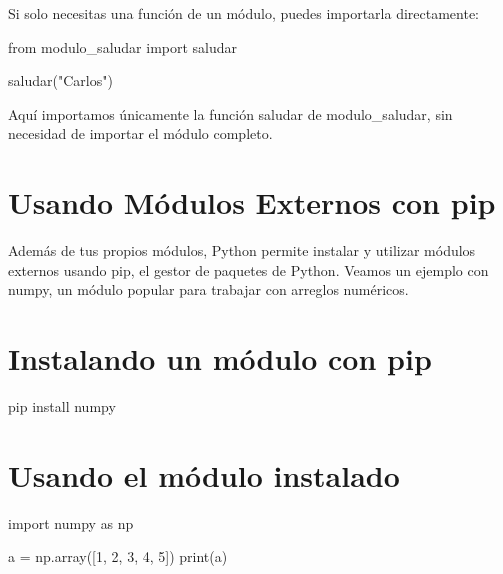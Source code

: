 \documentclass[
  a4paper,
  DIV=11,
  numbers=noendperiod,
  onepage,
  openany]{scrreprt}
\newenvironment{Shaded}{\begin{snugshade}}{\end{snugshade}}
\newcommand{\BuiltInTok}[1]{\textcolor[rgb]{0.00,0.23,0.31}{#1}}
\newcommand{\DecValTok}[1]{\textcolor[rgb]{0.68,0.00,0.00}{#1}}
\newcommand{\ExtensionTok}[1]{\textcolor[rgb]{0.00,0.23,0.31}{#1}}
\newcommand{\ImportTok}[1]{\textcolor[rgb]{0.00,0.46,0.62}{#1}}
\newcommand{\NormalTok}[1]{\textcolor[rgb]{0.00,0.23,0.31}{#1}}
\newcommand{\OperatorTok}[1]{\textcolor[rgb]{0.37,0.37,0.37}{#1}}
\newcommand{\StringTok}[1]{\textcolor[rgb]{0.13,0.47,0.30}{#1}}
\begin{document}
Si solo necesitas una función de un módulo, puedes importarla
directamente:

\begin{Shaded}
\begin{Highlighting}[]
\ImportTok{from}\NormalTok{ modulo\_saludar }\ImportTok{import}\NormalTok{ saludar}

\NormalTok{saludar(}\StringTok{"Carlos"}\NormalTok{)}
\end{Highlighting}
\end{Shaded}

Aquí importamos únicamente la función saludar de modulo\_saludar, sin
necesidad de importar el módulo completo.

\section{Usando Módulos Externos con
pip}\label{usando-muxf3dulos-externos-con-pip}

Además de tus propios módulos, Python permite instalar y utilizar
módulos externos usando pip, el gestor de paquetes de Python. Veamos un
ejemplo con numpy, un módulo popular para trabajar con arreglos
numéricos.

\section{Instalando un módulo con
pip}\label{instalando-un-muxf3dulo-con-pip}

\begin{Shaded}
\begin{Highlighting}[]
\ExtensionTok{pip}\NormalTok{ install numpy}
\end{Highlighting}
\end{Shaded}

\section{Usando el módulo
instalado}\label{usando-el-muxf3dulo-instalado}

\begin{Shaded}
\begin{Highlighting}[]
\ImportTok{import}\NormalTok{ numpy }\ImportTok{as}\NormalTok{ np}

\NormalTok{a }\OperatorTok{=}\NormalTok{ np.array([}\DecValTok{1}\NormalTok{, }\DecValTok{2}\NormalTok{, }\DecValTok{3}\NormalTok{, }\DecValTok{4}\NormalTok{, }\DecValTok{5}\NormalTok{])}
\BuiltInTok{print}\NormalTok{(a)}
\end{Highlighting}
\end{Shaded}
\end{document}
